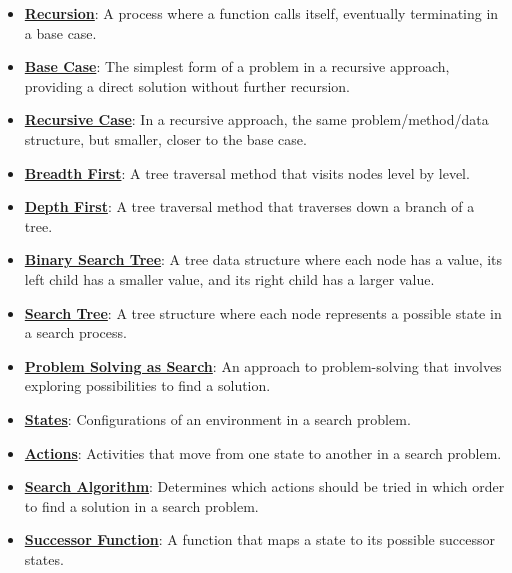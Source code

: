\documentclass{article}%
\begin{document}
\begin{itemize}[leftmargin=*]%
\item \href{https://www.math.purdue.edu/~yipn/351/14L1-DepthFS.pdf#page=2}{\textbf{Recursion}}: A process where a function calls itself, eventually terminating in a base case.%
\item \href{https://www.math.purdue.edu/~yipn/351/14L1-DepthFS.pdf#page=5}{\textbf{Base Case}}: The simplest form of a problem in a recursive approach, providing a direct solution without further recursion.%
\item \href{https://www.math.purdue.edu/~yipn/351/14L1-DepthFS.pdf#page=5}{\textbf{Recursive Case}}: In a recursive approach, the same problem/method/data structure, but smaller, closer to the base case.%
\item \href{https://www.math.purdue.edu/~yipn/351/14L1-DepthFS.pdf#page=8}{\textbf{Breadth First}}: A tree traversal method that visits nodes level by level.%
\item \href{https://www.math.purdue.edu/~yipn/351/14L1-DepthFS.pdf#page=8}{\textbf{Depth First}}: A tree traversal method that traverses down a branch of a tree.%
\item \href{https://www.math.purdue.edu/~yipn/351/14L1-DepthFS.pdf#page=9}{\textbf{Binary Search Tree}}: A tree data structure where each node has a value, its left child has a smaller value, and its right child has a larger value.%
\item \href{https://www.math.purdue.edu/~yipn/351/14L1-DepthFS.pdf#page=11}{\textbf{Search Tree}}: A tree structure where each node represents a possible state in a search process.%
\item \href{https://www.math.purdue.edu/~yipn/351/14L1-DepthFS.pdf#page=12}{\textbf{Problem Solving as Search}}: An approach to problem-solving that involves exploring possibilities to find a solution.%
\item \href{https://www.math.purdue.edu/~yipn/351/14L1-DepthFS.pdf#page=14}{\textbf{States}}: Configurations of an environment in a search problem.%
\item \href{https://www.math.purdue.edu/~yipn/351/14L1-DepthFS.pdf#page=14}{\textbf{Actions}}: Activities that move from one state to another in a search problem.%
\item \href{https://www.math.purdue.edu/~yipn/351/14L1-DepthFS.pdf#page=14}{\textbf{Search Algorithm}}: Determines which actions should be tried in which order to find a solution in a search problem.%
\item \href{https://www.math.purdue.edu/~yipn/351/14L1-DepthFS.pdf#page=36}{\textbf{Successor Function}}: A function that maps a state to its possible successor states.%

\end{itemize}
\end{document}

